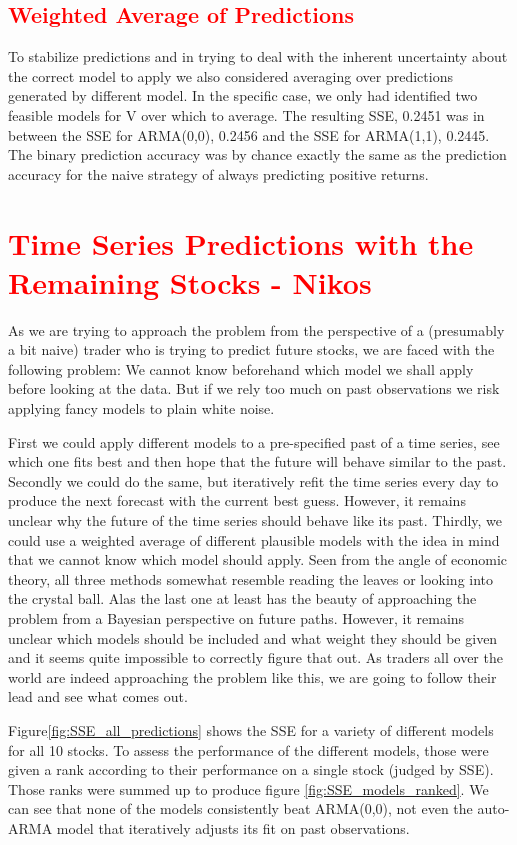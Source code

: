 \subsection{\textcolor{red}{Weighted Average of Predictions}}
To stabilize predictions and in trying to deal with the inherent uncertainty about the correct model to apply we also considered averaging over predictions generated by different model. In the specific case, we only had identified two feasible models for V over which to average. The resulting SSE, 0.2451 was in between the SSE for ARMA(0,0), 0.2456 and the SSE for ARMA(1,1), 0.2445. The binary prediction accuracy was by chance exactly the same as the prediction accuracy for the naive strategy of always predicting positive returns. 

\section{\textcolor{red}{Time Series Predictions with the Remaining Stocks - Nikos}}

As we are trying to approach the problem from the perspective of a (presumably a bit naive) trader who is trying to predict future stocks, we are faced with the following problem: We cannot know beforehand which model we shall apply before looking at the data. But if we rely too much on past observations we risk applying fancy models to plain white noise. 

First we could apply different models to a pre-specified past of a time series, see which one fits best and then hope that the future will behave similar to the past. Secondly we could do the same, but iteratively refit the time series every day to produce the next forecast with the current best guess. However, it remains unclear why the future of the time series should behave like its past. Thirdly, we could use a weighted average of different plausible models with the idea in mind that we cannot know which model should apply. Seen from the angle of economic theory, all three methods somewhat resemble reading the leaves or looking into the crystal ball. Alas the last one at least has the beauty of approaching the problem from a Bayesian perspective on future paths. However, it remains unclear which models should be included and what weight they should be given and it seems quite impossible to correctly figure that out. As traders all over the world are indeed approaching the problem like this, we are going to follow their lead and see what comes out. 

Figure\ref{fig:SSE_all_predictions} shows the SSE for a variety of different models for all 10 stocks. To assess the performance of the different models, those were given a rank according to their performance on a single stock (judged by SSE). Those ranks were summed up to produce figure \ref{fig:SSE_models_ranked}. We can see that none of the models consistently beat ARMA(0,0), not even the auto-ARMA model that iteratively adjusts its fit on past observations.


